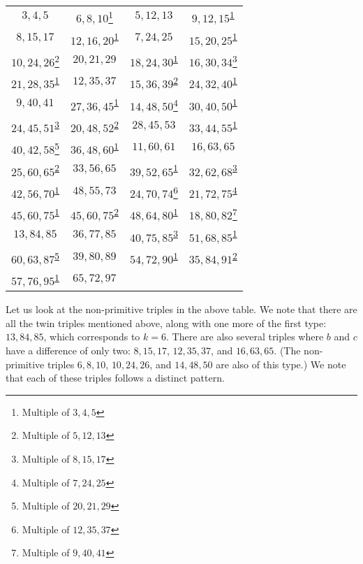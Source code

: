 \documentclass[letterpaper,12pt]{article}
\theoremstyle{definition}
\begin{document}
\begin{minipage}{\textwidth}
\begin{center}
 \begin{tabular}{cccc}
  $3,4,5$ & $6,8,10$\footnote{\label{1} Multiple of $3,4,5$} & $5,12,13$ & $9,12,15$\textsuperscript{\ref{1}}\\
  $8,15,17$ & $12,16,20$\textsuperscript{\ref{1}} & $7,24,25$ & $15,20,25$\textsuperscript{\ref{1}}\\
  $10,24,26$\footnote{\label{2} Multiple of $5,12,13$} & $20,21,29$ & $18,24,30$\textsuperscript{\ref{1}} & $16,30,34$\footnote{\label{3} Multiple of $8,15,17$}\\
  $21,28,35$\textsuperscript{\ref{1}} & $12,35,37$ & $15,36,39$\textsuperscript{\ref{2}} & $24,32,40$\textsuperscript{\ref{1}}\\
  $9,40,41$ & $27,36,45$\textsuperscript{\ref{1}} & $14,48,50$\footnote{\label{4} Multiple of $7,24,25$} & $30,40,50$\textsuperscript{\ref{1}}\\
  $24,45,51$\textsuperscript{\ref{3}} & $20,48,52$\textsuperscript{\ref{2}} & $28,45,53$ & $33,44,55$\textsuperscript{\ref{1}}\\
  $40,42,58$\footnote{\label{5} Multiple of $20,21,29$} & $36,48,60$\textsuperscript{\ref{1}} & $11,60,61$ & $16,63,65$\\
  $25,60,65$\textsuperscript{\ref{2}} & $33,56,65$ & $39,52,65$\textsuperscript{\ref{1}} & $32,62,68$\textsuperscript{\ref{3}}\\
  $42,56,70$\textsuperscript{\ref{1}} & $48,55,73$ & $24,70,74$\footnote{\label{6} Multiple of $12,35,37$} & $21,72,75$\textsuperscript{\ref{4}}\\
  $45,60,75$\textsuperscript{\ref{1}} & $45,60,75$\textsuperscript{\ref{2}} & $48,64,80$\textsuperscript{\ref{1}} & $18,80,82$\footnote{\label{7} Multiple of $9,40,41$}\\
  $13,84,85$ & $36,77,85$ & $40,75,85$\textsuperscript{\ref{3}} & $51,68,85$\textsuperscript{\ref{1}}\\
  $60,63,87$\textsuperscript{\ref{5}} & $39,80,89$ & $54,72,90$\textsuperscript{\ref{1}} & $35,84,91$\textsuperscript{\ref{2}}\\
  $57,76,95$\textsuperscript{\ref{1}} & $65,72,97$
 \end{tabular}
\end{center}
\end{minipage}

\bigskip

Let us look at the non-primitive triples in the above table. We note that there are all the twin triples mentioned above, along with one more of the first type: $13,84,85$, which corresponds to $k=6$. There are also several triples where $b$ and $c$ have a difference of only two: $8,15,17$, $12,35,37$, and $16,63,65$. (The non-primitive triples $6,8,10$, $10,24,26$, and $14,48,50$ are also of this type.) We note that each of these triples follows a distinct pattern.
\end{document}
